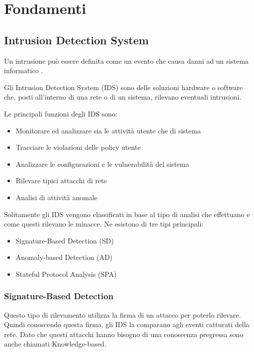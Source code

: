 \chapter{Fondamenti}

\section{Intrusion Detection System}


Un intrusione può essere definita come un evento che causa danni ad un sistema informatico \cite{SurveyIntrusionDetection2019}.

Gli Intrusion Detection System (IDS) sono delle soluzioni hardware o software che, posti all'interno di una rete o di un sistema, rilevano eventuali intrusioni. 

\cite{ashoorImportanceIntrusionDetection2010} Le principali funzioni degli IDS sono: 

\begin{itemize}
    \item Monitorare ed analizzare sia le attività utente che di sistema
    \item Tracciare le violazioni delle policy utente
    \item Analizzare le configurazioni e le vulnerabilità del sistema
    \item Rilevare tipici attacchi di rete
    \item Analisi di attività anomale
\end{itemize}


\cite{liaoIntrusionDetectionSystem2013} Solitamente gli IDS vengono classificati in base al tipo di analisi che effettuano e come questi rilevano le minacce. Ne esistono di tre tipi principali:


\begin{itemize}
    \item Signature-Based Detection (SD)
    \item Anomaly-based Detection (AD)
    \item Stateful Protocol Analysis (SPA)
\end{itemize}



\subsection{Signature-Based Detection}

Questo tipo di rilevamento utilizza la firma di un attacco per poterlo rilevare. Quindi conoscendo questa firma, gli IDS la comparano agli eventi catturati della rete. Dato che questi attacchi hanno bisogno di una conoscenza pregressa sono anche chiamati Knowledge-based.


